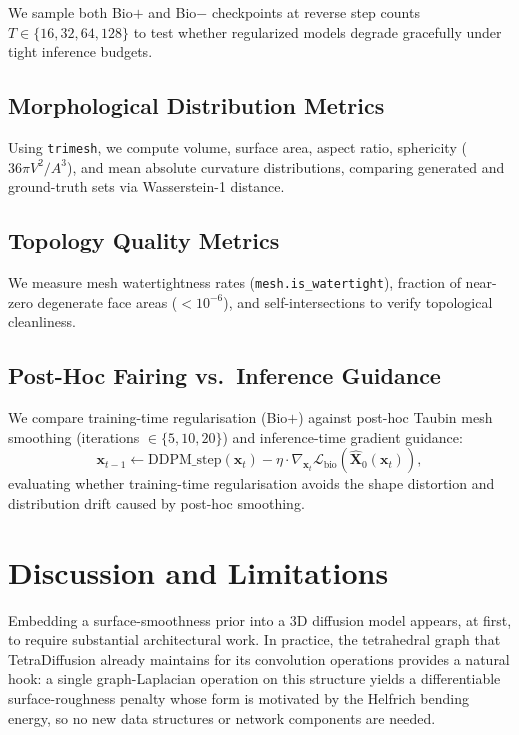 \documentclass[10pt, a4paper, twocolumn]{article}
\begin{document}
We sample both Bio$+$ and Bio$-$ checkpoints at reverse step counts $T \in \{16, 32, 64, 128\}$ to test whether regularized models degrade gracefully under tight inference budgets.

\subsection{Morphological Distribution Metrics}
\label{sec:ablation_morpho}

Using \texttt{trimesh}, we compute volume, surface area, aspect ratio, sphericity ($36\pi V^2 / A^3$), and mean absolute curvature distributions, comparing generated and ground-truth sets via Wasserstein-1 distance.

\subsection{Topology Quality Metrics}
\label{sec:ablation_topology}

We measure mesh watertightness rates (\texttt{mesh.is\_watertight}), fraction of near-zero degenerate face areas ($< 10^{-6}$), and self-intersections to verify topological cleanliness.

\subsection{Post-Hoc Fairing vs.\ Inference Guidance}
\label{sec:ablation_posthoc}

We compare training-time regularisation (Bio$+$) against post-hoc Taubin mesh smoothing (iterations $\in \{5, 10, 20\}$) and inference-time gradient guidance:
\begin{equation}
    \mathbf{x}_{t-1} \leftarrow \text{DDPM\_step}(\mathbf{x}_t) - \eta \cdot \nabla_{\mathbf{x}_t} \mathcal{L}_{\text{bio}}\!\left(\hat{\mathbf{X}}_0(\mathbf{x}_t)\right),
\end{equation}
evaluating whether training-time regularisation avoids the shape distortion and distribution drift caused by post-hoc smoothing.

\section{Discussion and Limitations}
\label{sec:discussion}

Embedding a surface-smoothness prior into a 3D diffusion model appears, at first, to require substantial architectural work. In practice, the tetrahedral graph that TetraDiffusion already maintains for its convolution operations provides a natural hook: a single graph-Laplacian operation on this structure yields a differentiable surface-roughness penalty whose form is motivated by the Helfrich bending energy, so no new data structures or network components are needed.
\end{document}
